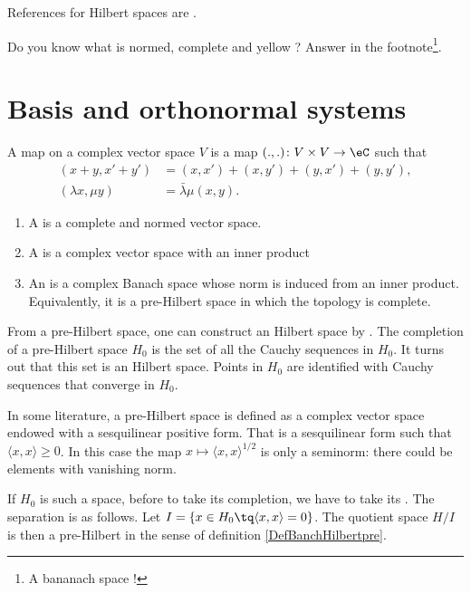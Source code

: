 References for Hilbert spaces are \cite{Wassermann,Landsman}.

Do you know what is normed, complete and yellow ? Answer in the footnote\footnote{A bananach space !}.

\section{Basis and orthonormal systems}

A  map on a complex vector space $V$ is a map $(.,.)\colon V\times V\to \eC$ such that
\[ 
\begin{split}
(x+y,x'+y')&=(x,x')+(x,y')+(y,x')+(y,y'),\\
(\lambda x,\mu y)&=\bar\lambda\mu(x,y).
\end{split}  
\]

\begin{definition}		\label{DefBanchHilbertpre}
	\begin{enumerate}
		\item
			A  is a complete and normed vector space.
		\item
			A  is a complex vector space with an inner product
		\item
			An  is a complex Banach space whose norm is induced from an inner product. Equivalently, it is a pre-Hilbert space in which the topology is complete.
	\end{enumerate}
\end{definition}

From a pre-Hilbert space, one can construct an Hilbert space by . The completion of a pre-Hilbert space $H_0$ is the set of all the Cauchy sequences in $H_0$. It turns out that this set is an Hilbert space. Points in $H_0$ are identified with Cauchy sequences that converge in $H_0$.

\begin{remark}
	In some literature\cite{AlgOpGirard}, a pre-Hilbert space is defined as a complex vector space endowed with a sesquilinear positive form. That is a sesquilinear form such that $\langle x, x\rangle \geq 0$. In this case the map $x\mapsto\langle x, x\rangle ^{1/2}$ is only a seminorm: there could be elements with vanishing norm.

	If $H_0$ is such a space, before to take its completion, we have to take its . The separation is as follows. Let $I=\{ x\in H_0\tq \langle x, x\rangle =0 \}$. The quotient space $H/I$ is then a pre-Hilbert in the sense of definition \ref{DefBanchHilbertpre}.
\end{remark}

